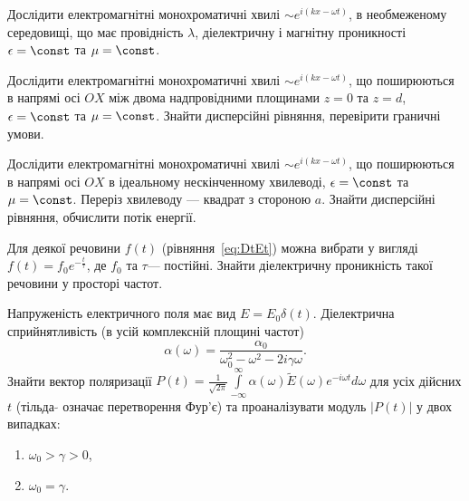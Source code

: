 \begin{problem}
Дослідити електромагнітні монохроматичні хвилі $\sim e^{i(kx - \omega t)}$, в необмеженому середовищі, що має провідність $\lambda$, діелектричну і магнітну проникності $\epsilon = \const$ та $\mu = \const$.
\end{problem}

\begin{problem}
Дослідити електромагнітні монохроматичні хвилі $\sim e^{i(kx - \omega t)}$, що поширюються в напрямі осі $OX$ між двома надпровідними площинами $z=0$ та $z=d$, $\epsilon = \const$ та $\mu = \const$. Знайти дисперсійні рівняння, перевірити граничні умови.
\end{problem}

\begin{problem}
Дослідити електромагнітні монохроматичні хвилі $\sim e^{i(kx - \omega t)}$, що поширюються в напрямі осі $OX$ в ідеальному нескінченному хвилеводі, $\epsilon = \const$ та $\mu = \const$. Переріз хвилеводу --- квадрат з стороною $a$. Знайти дисперсійні рівняння, обчислити потік енергії.
\end{problem}

\begin{problem}
Для деякої речовини $f(t)$ (рівняння~\eqref{eq:DtEt}) можна вибрати у вигляді $f(t) = f_0e^{-\frac{t}{\tau}}$, де $f_0$ та $\tau$--- постійні. Знайти діелектричну проникність такої речовини у просторі частот.
\end{problem}


\begin{problem}
Напруженість електричного поля має вид  $E = E_0\delta(t)$. Діелектрична сприйнятливість (в усій комплексній площині частот)
\[
	\alpha (\omega ) = \frac{\alpha _0}{\omega _0^2 - \omega ^2 - 2i\gamma \omega }.
\]
Знайти вектор поляризації $P(t) = \frac{1}{\sqrt{2\pi}}\int\limits_{- \infty }^\infty\alpha (\omega )\tilde E(\omega ){e^{ - i\omega t}}d\omega $ для усіх дійсних $t$  (тільда $\tilde{}$ означає перетворення Фур’є) та проаналізувати  модуль $|P(t)|$  у двох випадках:
\begin{enumerate}[label=\alph*)]
	\item $\omega_0 > \gamma >0$,
	\item $\omega_0 = \gamma$.
\end{enumerate}
\end{problem}


